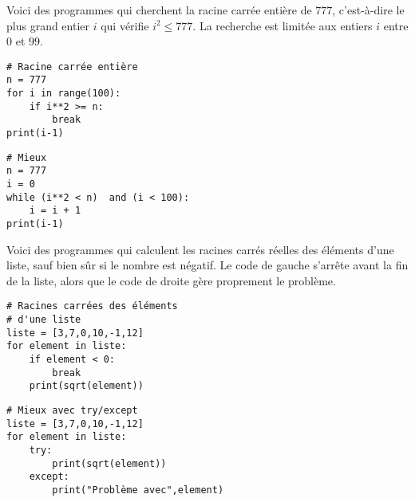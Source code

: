 \documentclass[11pt,class=report,crop=false]{standalone}
\begin{document}
\begin{cours}
\begin{exemple}

Voici des programmes qui cherchent la racine carrée entière de $777$, c'est-à-dire le plus grand entier $i$ qui vérifie $i^2 \le 777$. La recherche est limitée aux entiers $i$ entre $0$ et $99$.

\begin{minipage}{0.4\textwidth}
\begin{lstlisting}
# Racine carrée entière
n = 777
for i in range(100):
    if i**2 >= n:
        break
print(i-1)
\end{lstlisting}
\end{minipage}\qquad\qquad
\begin{minipage}{0.4\textwidth}
\begin{lstlisting}
# Mieux
n = 777
i = 0 
while (i**2 < n)  and (i < 100):
    i = i + 1
print(i-1) 
\end{lstlisting}
\end{minipage}
\end{exemple}

\begin{exemple}

Voici des programmes qui calculent les racines carrés réelles des éléments d'une liste, sauf bien sûr si le nombre est négatif. Le code de gauche s'arrête avant la fin de la liste, alors que le code de droite gère proprement le problème.

\begin{minipage}{0.4\textwidth}
\begin{lstlisting}
# Racines carrées des éléments 
# d'une liste
liste = [3,7,0,10,-1,12]
for element in liste:
    if element < 0:
        break
    print(sqrt(element))
\end{lstlisting}
\end{minipage}\qquad\qquad
\begin{minipage}{0.4\textwidth}
\begin{lstlisting}
# Mieux avec try/except
liste = [3,7,0,10,-1,12]
for element in liste:
    try: 
        print(sqrt(element))
    except:
        print("Problème avec",element)
\end{lstlisting}
\end{minipage}
\end{exemple}


\end{cours}
\end{document}
